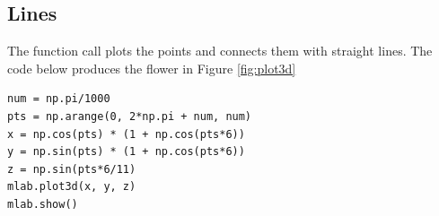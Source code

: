 \subsection*{Lines}
The function call  plots the points  and connects them with straight lines.
The code below produces the flower in Figure \ref{fig:plot3d}

\begin{lstlisting}
num = np.pi/1000
pts = np.arange(0, 2*np.pi + num, num)
x = np.cos(pts) * (1 + np.cos(pts*6))
y = np.sin(pts) * (1 + np.cos(pts*6))
z = np.sin(pts*6/11)
mlab.plot3d(x, y, z)
mlab.show()
\end{lstlisting}

